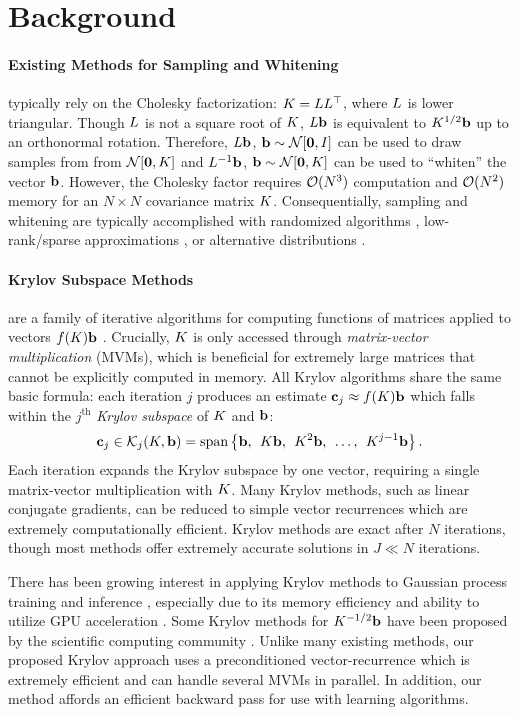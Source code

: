 \section{Background}


\paragraph{Existing Methods for Sampling and Whitening}
typically rely on the Cholesky factorization: $K = L L^\top$, where $L$ is lower triangular.
Though $L$ is not a square root of $K$, $L\mathbf{b}$ is equivalent to $K^{1/2} \mathbf{b}$ up to an orthonormal rotation.
Therefore, $L\mathbf{b}$, $\bb \sim \normaldist{\bzero}{\bI}$ can be used to draw samples from from $\normaldist{\bzero}{\bK}$ and $L^{-1} \mathbf{b}$, $\bb \sim \normaldist{\bzero}{\bK}$ can be used to ``whiten'' the vector $\mathbf{b}$.
However, the Cholesky factor requires $\bigo{N^3}$ computation and $\bigo{N^2}$ memory for an $N \times N$ covariance matrix $K$.
Consequentially, sampling and whitening are typically accomplished with randomized algorithms , low-rank/sparse approximations , or alternative distributions .

\paragraph{Krylov Subspace Methods}
are a family of iterative algorithms for computing functions of matrices applied to vectors $f(K) \mathbf{b}$ \citep[e.g.][]{schneider2001krylov,saad2003iterative,van2003iterative}.
Crucially, $K$ is only accessed through \emph{matrix-vector multiplication} (MVMs), which is beneficial for extremely large matrices that cannot be explicitly computed in memory.
All Krylov algorithms share the same basic formula: each iteration $j$ produces an estimate $\mathbf{c}_j \approx f(K) \mathbf{b}$ which falls within the $j^\text{th}$ \emph{Krylov subspace} of $K$ and $\mathbf{b}$:
\[
  \mathbf{c}_j \in \mathcal{K}_j (K, \mathbf{b}) = \text{span} \left\{ \mathbf{b}, \:\: K \mathbf{b}, \:\: K^2 \mathbf{b}, \:\: \ldots, \:\: K^{j-1} \mathbf{b} \right\}.
\]
Each iteration expands the Krylov subspace by one vector, requiring a single matrix-vector multiplication with $K$.
Many Krylov methods, such as linear conjugate gradients, can be reduced to simple vector recurrences which are extremely computationally efficient.
Krylov methods are exact after $N$ iterations, though most methods offer extremely accurate solutions in $J \ll N$ iterations.

There has been growing interest in applying Krylov methods to Gaussian process training and inference , especially due to its memory efficiency and ability to utilize GPU acceleration \cite{gardner2018gpytorch,wang2019exact}.
Some Krylov methods for $K^{-1/2} \mathbf{b}$ have been proposed by the scientific computing community \cite{aune2013iterative,aune2014parameter,chow2014preconditioned,saibaba2013flexible}.
Unlike many existing methods, our proposed Krylov approach uses a preconditioned vector-recurrence which is extremely efficient and can handle several MVMs in parallel.
In addition, our method affords an efficient backward pass for use with learning algorithms.




